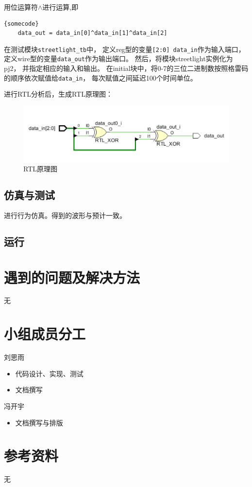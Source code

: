 \documentclass[UTF8]{article}
\begin{document}
用位运算符$\wedge$进行运算,即
\lstset{language=verilog}
\begin{lstlisting}[frame=tb]{somecode}
    data_out = data_in[0]^data_in[1]^data_in[2]
\end{lstlisting}

在测试模块\lstinline{streetlight_tb}中，
定义reg型的变量\lstinline{[2:0] data_in}作为输入端口，
定义wire型的变量\lstinline{data_out}作为输出端口。
然后，将模块streetlight实例化为pj2，
并指定相应的输入和输出。
在initial块中，将0-7的三位二进制数按照格雷码的顺序依次赋值给\lstinline{data_in}，
每次赋值之间延迟100个时间单位。

进行RTL分析后，生成RTL原理图：
​
\begin{figure}[htbp]
    \centering
    \includegraphics[scale=0.7]{0.png}
    \caption{RTL原理图}
\end{figure}

\subsection{仿真与测试}
进行行为仿真。得到的波形与预计一致。
\subsection{运行}

\section{遇到的问题及解决方法}
无

\section{小组成员分工}
刘思雨
\begin{itemize}
    \item 代码设计、实现、测试
    \item 文档撰写
\end{itemize}

冯开宇
\begin{itemize}
    \item 文档撰写与排版
\end{itemize}
\section{参考资料}
无
\end{document}
